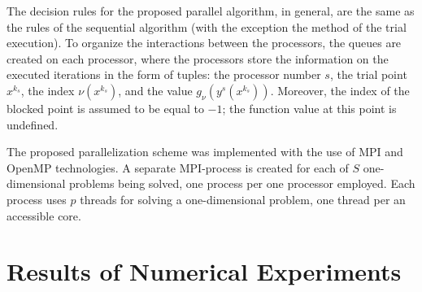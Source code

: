 \documentclass[smallextended]{svjour3}       %
\begin{document}
The decision rules for the proposed parallel algorithm, in general, are the same as the rules of the sequential algorithm (with the exception the method of the trial execution). To organize the interactions between the processors, the queues are created on each processor, where the processors store the information on the executed iterations in the form of tuples: the processor number $s$, the trial point $x^{k_s}$, the index $\nu(x^{k_s})$, and the value $g_\nu(y^s (x^{k_s} ) )$. Moreover, the index of the blocked point is assumed to be equal to $-1$; the function value at this point is undefined.

The proposed parallelization scheme was implemented with the use of MPI and OpenMP technologies. A separate MPI-process is created for each of $S$ one-dimensional problems being solved, one process per one processor employed. Each process uses $p$ threads for solving a one-dimensional problem, one thread per an accessible core.



\section{Results of Numerical Experiments}
\label{sec:4}
\end{document}
